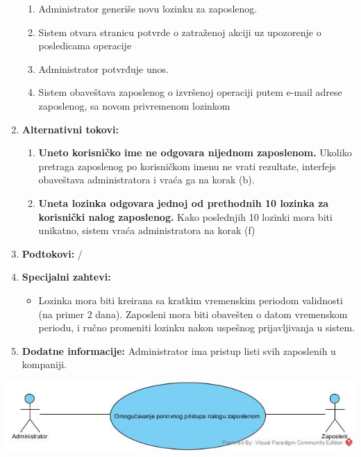 \documentclass[a4paper]{article}
\begin{document}
\begin{enumerate}
\begin{enumerate}
            \item Administrator generiše novu lozinku za zaposlenog.
            \item Sistem otvara stranicu potvrde o zatraženoj akciji uz upozorenje o posledicama operacije
            \item Administrator potvrđuje unos.
            \item Sistem obaveštava zaposlenog o izvršenoj operaciji putem e-mail adrese zaposlenog, sa novom privremenom lozinkom
        \end{enumerate}
    \item \textbf{Alternativni tokovi:}
        \begin{enumerate}
            \item \textbf{Uneto korisničko ime ne odgovara nijednom zaposlenom.} Ukoliko pretraga zaposlenog po korisničkom imenu ne vrati rezultate, interfejs obaveštava administratora i vraća ga na korak (b).
            \item \textbf{Uneta lozinka odgovara jednoj od prethodnih 10 lozinka za korisnički nalog zaposlenog.} Kako poslednjih 10 lozinki mora biti unikatno, sistem vraća administratora na korak (f)
        \end{enumerate}
    \item \textbf{Podtokovi:} /
    \item \textbf{Specijalni zahtevi:}
        \begin{itemize}
            \item Lozinka mora biti kreirana sa kratkim vremenskim periodom validnosti (na primer 2 dana). Zaposleni mora biti obavešten o datom vremenskom periodu, i ručno promeniti lozinku nakon uspešnog prijavljivanja u sistem.
        \end{itemize}
    \item \textbf{Dodatne informacije:} Administrator ima pristup listi svih zaposlenih u kompaniji.
\end{enumerate}

\includegraphics[scale=0.5]{UML/SlucajUpotrebe_PonovniPristupNalogu.jpg}
\end{document}
